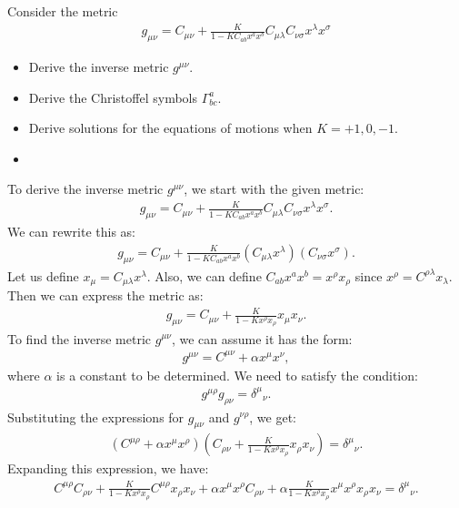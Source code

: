 \clearpage
{}
Consider the metric
\begin{align}
    g_{\mu\nu}=C_{\mu\nu} + \frac{K}{1-KC_{ab} x^a x^b} C_{\mu\lambda} C_{\nu\sigma} x^\lambda x^\sigma
\end{align}
\begin{itemize}
    \item [(a)] Derive the inverse metric $g^{\mu\nu}$.
    \item [(b)] Derive the Christoffel symbols $\Gamma^a_{bc}$.
    \item [(c)] Derive solutions for the equations of motions when $K=+1,0,-1$.
\end{itemize}
\answer{}
\begin{itemize}
    \item [(a)]
\end{itemize}
To derive the inverse metric $g^{\mu\nu}$, we start with the given metric:
\begin{align}
    g_{\mu\nu}=C_{\mu\nu} + \frac{K}{1-KC_{ab} x^a x^b} C_{\mu\lambda} C_{\nu\sigma} x^\lambda x^\sigma.
\end{align}
We can rewrite this as:
\begin{align}
    g_{\mu\nu} = C_{\mu\nu} + \frac{K}{1-KC_{ab} x^a x^b} (C_{\mu\lambda} x^\lambda)(C_{\nu\sigma} x^\sigma).
\end{align}
Let us define $x_\mu = C_{\mu\lambda} x^\lambda$. Also, we can define $C_{ab} x^a x^b = x^\rho x_\rho$ since $x^\rho = C^{\rho\lambda} x_\lambda$. Then we can express the metric as:
\begin{align}
    g_{\mu\nu} = C_{\mu\nu} + \frac{K}{1-Kx^\rho x_\rho} x_\mu x_\nu.
\end{align}
To find the inverse metric $g^{\mu\nu}$, we can assume it has the form:
\begin{align}
    g^{\mu\nu} = C^{\mu\nu} + \alpha x^\mu x^\nu,
\end{align}
where $\alpha$ is a constant to be determined. We need to satisfy the condition:
\begin{align}
    g^{\mu\rho} g_{\rho\nu} = \delta^\mu{}_\nu.
\end{align}
Substituting the expressions for $g_{\mu\nu}$ and $g^{\nu\rho}$, we get:
\begin{align}
    (C^{\mu\rho} + \alpha x^\mu x^\rho)(C_{\rho\nu} + \frac{K}{1-Kx^\rho x_\rho} x_\rho x_\nu) = \delta^\mu{}_\nu.
\end{align}
Expanding this expression, we have:
\begin{align}
    C^{\mu\rho} C_{\rho\nu} + \frac{K}{1-Kx^\rho x_\rho} C^{\mu\rho} x_\rho x_\nu + \alpha x^\mu x^\rho C_{\rho\nu} + \alpha \frac{K}{1-Kx^\rho x_\rho} x^\mu x^\rho x_\rho x_\nu = \delta^\mu{}_\nu.
\end{align}
